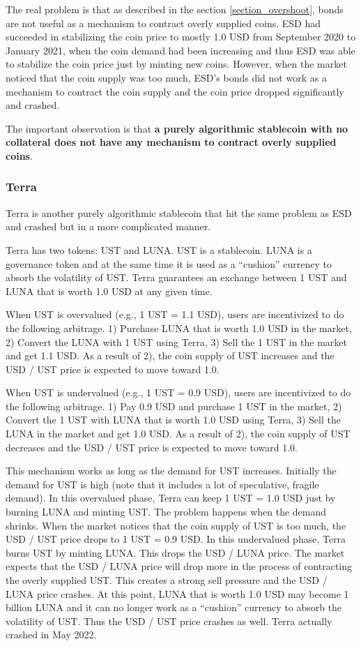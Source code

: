 \documentclass[dvipdfmx,a4paper]{article}
\begin{document}
The real problem is that as described in the section \ref{section_overshoot}, bonds are not useful as a mechanism to contract overly supplied coins. ESD had succeeded in stabilizing the coin price to mostly 1.0 USD from September 2020 to January 2021, when the coin demand had been increasing and thus ESD was able to stabilize the coin price just by minting new coins. However, when the market noticed that the coin supply was too much, ESD's bonds did not work as a mechanism to contract the coin supply and the coin price dropped significantly and crashed.

The important observation is that \textbf{a purely algorithmic stablecoin with no collateral does not have any mechanism to contract overly supplied coins}.

\subsubsection{Terra}

Terra is another purely algorithmic stablecoin that hit the same problem as ESD and crashed but in a more complicated manner.

Terra has two tokens: UST and LUNA. UST is a stablecoin. LUNA is a governance token and at the same time it is used as a ``cushion'' currency to absorb the volatility of UST. Terra guarantees an exchange between 1 UST and LUNA that is worth 1.0 USD at any given time.

When UST is overvalued (e.g., 1 UST = 1.1 USD), users are incentivized to do the following arbitrage. 1) Purchase LUNA that is worth 1.0 USD in the market, 2) Convert the LUNA with 1 UST using Terra, 3) Sell the 1 UST in the market and get 1.1 USD. As a result of 2), the coin supply of UST increases and the USD / UST price is expected to move toward 1.0.

When UST is undervalued (e.g., 1 UST = 0.9 USD), users are incentivized to do the following arbitrage. 1) Pay 0.9 USD and purchase 1 UST in the market, 2) Convert the 1 UST with LUNA that is worth 1.0 USD using Terra, 3) Sell the LUNA in the market and get 1.0 USD. As a result of 2), the coin supply of UST decreases and the USD / UST price is expected to move toward 1.0.

This mechanism works as long as the demand for UST increases. Initially the demand for UST is high (note that it includes a lot of speculative, fragile demand). In this overvalued phase, Terra can keep 1 UST = 1.0 USD just by burning LUNA and minting UST. The problem happens when the demand shrinks. When the market notices that the coin supply of UST is too much, the USD / UST price drops to 1 UST = 0.9 USD. In this undervalued phase, Terra burns UST by minting LUNA. This drops the USD / LUNA price. The market expects that the USD / LUNA price will drop more in the process of contracting the overly supplied UST. This creates a strong sell pressure and the USD / LUNA price crashes. At this point, LUNA that is worth 1.0 USD may become 1 billion LUNA and it can no longer work as a ``cushion'' currency to absorb the volatility of UST. Thus the USD / UST price crashes as well. Terra actually crashed in May 2022.
\end{document}
